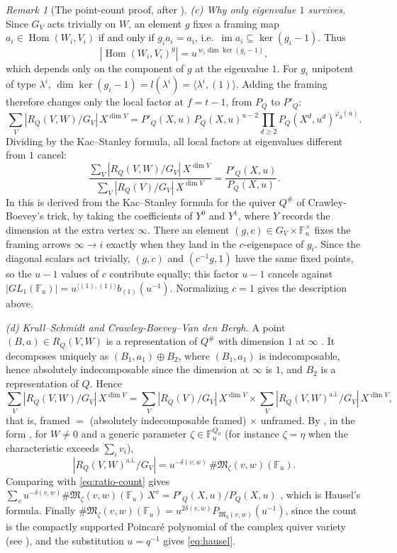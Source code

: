 \documentclass[11pt]{amsart}
\theoremstyle{definition}
\theoremstyle{remark}
\newtheorem{remark}[theorem]{Remark}
\numberwithin{equation}{section}
\newcommand{\F}{\mathbb{F}}
\begin{document}
\begin{remark}[The point-count proof, after \cite{Nak04}]
\emph{(c) Why only eigenvalue $1$ survives.} Since $G_V$ acts trivially on $W$, an element $g$ fixes a
framing map $a_i\in\operatorname{Hom}(W_i,V_i)$ if and only if $g_ia_i=a_i$, i.e.\
$\operatorname{im}a_i\subseteq\ker(g_i-1)$. Thus
\[
  |\operatorname{Hom}(W_i,V_i)^g|=u^{\,w_i\dim\ker(g_i-1)},
\]
which depends only on the component of $g$ at the eigenvalue $1$. For $g_i$ unipotent of type $\lambda^i$,
$\dim\ker(g_i-1)=l(\lambda^i)=\langle\lambda^i,(1)\rangle$. Adding the framing therefore changes only the
local factor at $f=t-1$, from $P_Q$ to $P'_Q$:
\[
  \sum_V|R_Q(V,W)/G_V|\,X^{\dim V}=P'_Q(X,u)\,P_Q(X,u)^{u-2}\prod_{d\ge2}P_Q(X^d,u^d)^{\varphi_d(u)}.
\]
Dividing by the Kac--Stanley formula, all local factors at eigenvalues different from $1$ cancel:
\begin{equation}\label{eq:ratio-count}
  \frac{\sum_V|R_Q(V,W)/G_V|\,X^{\dim V}}{\sum_V|R_Q(V)/G_V|\,X^{\dim V}}=\frac{P'_Q(X,u)}{P_Q(X,u)} .
\end{equation}
In \cite{Nak04} this is derived from the Kac--Stanley formula for the quiver $Q^\#$ of Crawley-Boevey's
trick, by taking the coefficients of $Y^0$ and $Y^1$, where $Y$ records the dimension at the extra vertex
$\infty$. There an element $(g,c)\in G_V\times\F_u^\times$ fixes the framing arrows $\infty\to i$ exactly
when they land in the $c$-eigenspace of $g_i$. Since the diagonal scalars act trivially, $(g,c)$ and
$(c^{-1}g,1)$ have the same fixed points, so the $u-1$ values of $c$ contribute equally; this factor
$u-1$ cancels against $|GL_1(\F_u)|=u^{\langle(1),(1)\rangle}b_{(1)}(u^{-1})$. Normalizing $c=1$ gives
the description above.

\emph{(d) Krull--Schmidt and Crawley-Boevey--Van den Bergh.} A point $(B,a)\in R_Q(V,W)$ is a
representation of $Q^\#$ with dimension $1$ at $\infty$ \cite{CB}. It decomposes uniquely as
$(B_1,a_1)\oplus B_2$, where $(B_1,a_1)$ is indecomposable, hence absolutely indecomposable since the
dimension at $\infty$ is $1$, and $B_2$ is a representation of $Q$. Hence
\[
  \sum_V|R_Q(V,W)/G_V|\,X^{\dim V}=\sum_V|R_Q(V)/G_V|\,X^{\dim V}\times\sum_V|R_Q(V,W)^{\mathrm{a.i.}}/G_V|\,X^{\dim V},
\]
that is, framed $=$ (absolutely indecomposable framed) $\times$ unframed. By
\cite[Proposition~2.2.1]{CBVdB}, in the form \cite[Theorem~1.1]{Nak04}, for $W\neq0$ and a generic
parameter $\zeta\in\F_u^{Q_0}$ (for instance $\zeta=\eta$ when the characteristic exceeds $\sum_iv_i$),
\[
  |R_Q(V,W)^{\mathrm{a.i.}}/G_V|=u^{-\delta(v,w)}\,\#\mathfrak M_\zeta(v,w)(\F_u).
\]
Comparing with \eqref{eq:ratio-count} gives
$\sum_vu^{-\delta(v,w)}\#\mathfrak M_\zeta(v,w)(\F_u)\,X^v=P'_Q(X,u)/P_Q(X,u)$ \cite[Theorem~1.2]{Nak04},
which is Hausel's formula. Finally $\#\mathfrak M_\zeta(v,w)(\F_u)=u^{2\delta(v,w)}P_{\mathfrak M_\eta(v,w)}(u^{-1})$, since the
count is the compactly supported Poincar\'e polynomial of the complex quiver variety (see
\cite[\S2]{Nak04}), and the substitution $u=q^{-1}$ gives \eqref{eq:hausel}.


\end{remark}
\end{document}
